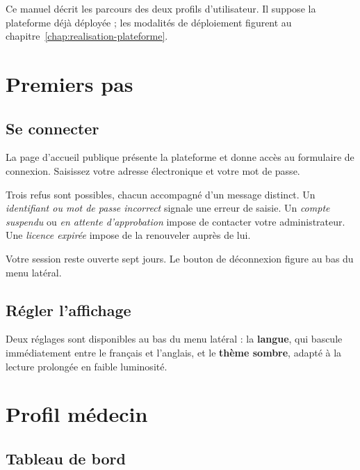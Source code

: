 Ce manuel décrit les parcours des deux profils d'utilisateur. Il suppose la plateforme
déjà déployée ; les modalités de déploiement figurent au
chapitre~\ref{chap:realisation-plateforme}.

\section{Premiers pas}

\subsection*{Se connecter}

La page d'accueil publique présente la plateforme et donne accès au formulaire de
connexion. Saisissez votre adresse électronique et votre mot de passe.

Trois refus sont possibles, chacun accompagné d'un message distinct. Un
\emph{identifiant ou mot de passe incorrect} signale une erreur de saisie. Un
\emph{compte suspendu} ou \emph{en attente d'approbation} impose de contacter votre
administrateur. Une \emph{licence expirée} impose de la renouveler auprès de lui.

Votre session reste ouverte sept jours. Le bouton de déconnexion figure au bas du menu
latéral.

\subsection*{Régler l'affichage}

Deux réglages sont disponibles au bas du menu latéral : la \textbf{langue}, qui bascule
immédiatement entre le français et l'anglais, et le \textbf{thème sombre}, adapté à la
lecture prolongée en faible luminosité.

\section{Profil médecin}

\subsection*{Tableau de bord}

